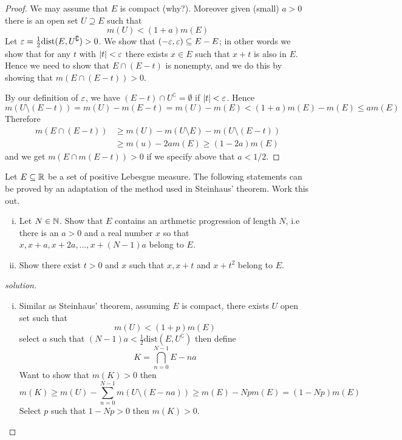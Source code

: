 \begin{proof}
  We may assume that $E$ is compact (why?). Moreover given (small)
  $a > 0$ there is an open set $U \supseteq E$ such that
  \[m(U) < (1+a)m(E)\]
  Let $\varepsilon = \frac12 \mathrm{dist}(E, U^\complement) > 0$. We show that 
  $(-\varepsilon, \varepsilon) \subseteq E-E$; in other words we show that for any $t$
  with $|t| < \varepsilon$ there exists $x \in E$ such that $x+t$ is also in $E$.
  Hence we need to show that $E \cap (E -t)$ is nonempty, and we do this
  by showing that $m(E \cap (E-t)) > 0$.

  By our definition of $\varepsilon$, we have $(E-t)\cap U^\complement = \emptyset$
  if $|t| < \varepsilon$. Hence
  \[m(U\setminus(E-t)) = m(U) - m(E-t)=m(U)-m(E)<(1+a)m(E)-m(E) \le am(E)\]
  Therefore
  \begin{align*}
    m(E \cap (E-t)) &\ge m(U) - m(U\setminus E) - m(U\setminus(E-t)) \\
    &\ge m(u) -2am(E) \ge (1-2a)m(E) 
  \end{align*}
  and we get $m(E \cap m(E-t)) > 0$ if we specify above that $a < 1/2$.
\end{proof}

\begin{problem}
  Let $E \subseteq \mathbb R$ be a set of positive Lebesgue measure. The following 
  statements can be proved by an adaptation of the method used in Steinhaus' theorem. Work this out.
  \begin{enumerate}[(i)]
    \item Let $N \in \mathbb N$. Show that $E$ contains an arthmetic progression of length $N$, 
    i.e there is an $a > 0$ and a real number $x$ so that $x, x+a, x+2a, \dotsc, x+(N-1)a$
    belong to $E$.
    \item Show there exist $t > 0$ and $x$ such that $x, x+t$ and $x+t^2$ belong to $E$.
  \end{enumerate}
\end{problem}
\pagebreak
\begin{proof}[solution]
  \begin{enumerate}[(i)]
    \item Similar as Steinhaus' theorem, assuming $E$ is compact, there exists $U$ open set such that
    \[m(U) < (1+p)m(E)\]
    select $a$ such that $(N-1)a < \frac12\mathrm{dist}(E, U^\complement)$ then
    define
    \[K = \bigcap_{n=0}^{N-1} E-na\]
    Want to show that $m(K) > 0$ then
    \[
      m(K) \ge m(U) - \sum_{n=0}^{N-1} m(U\setminus(E-na)) \ge m(E) - Npm(E) = (1-Np)m(E)
    \]
    Select $p$ such that $1-Np > 0$ then $m(K) > 0$.
  \end{enumerate} 
\end{proof}

